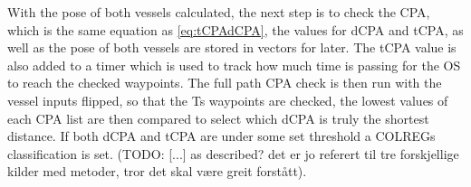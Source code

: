 
With the pose of both vessels calculated, the next step is to check the CPA, which is the same equation as \eqref{eq:tCPAdCPA}, the values for
\gls{dCPA} and \gls{tCPA}, as well as the pose of both vessels are stored in vectors for later. The \gls{tCPA} value is also added to a timer which is
used to track how much time is passing for the \gls{OS} to reach the checked waypoints.
The full path CPA check is then run with the vessel inputs flipped, so that the \gls{Ts} waypoints are checked, the lowest values of each CPA list
are then compared to select which \gls{dCPA} is truly the shortest distance. If both dCPA and tCPA are under some set threshold a COLREGs classification is set.
(TODO: [...] as described? det er jo referert til tre forskjellige kilder med metoder, tror det skal være greit forstått).

